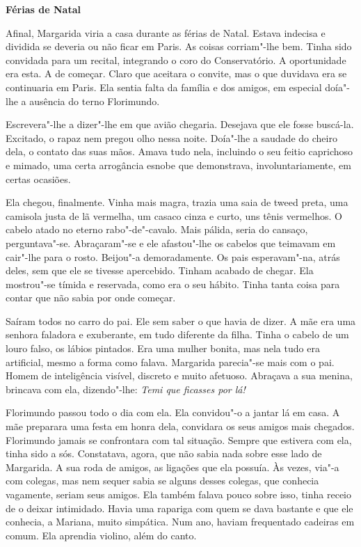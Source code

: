 \vspace*{1.8cm}
\noindent{}\textbf{Férias de Natal}

\bigskip

Afinal, Margarida viria a casa durante as férias de Natal. Estava
indecisa e dividida se deveria ou não ficar em Paris. As coisas
corriam"-lhe bem. Tinha sido convidada para um recital, integrando o coro
do Conservatório. A oportunidade era esta. A de começar. Claro que
aceitara o convite, mas o que duvidava era se continuaria em Paris. Ela
sentia falta da família e dos amigos, em especial doía"-lhe a ausência do
terno Florimundo.

Escrevera"-lhe a dizer"-lhe em que avião chegaria. Desejava que ele fosse
buscá-la. Excitado, o rapaz nem pregou olho nessa noite. Doía"-lhe a
saudade do cheiro dela, o contato das suas mãos. Amava tudo nela,
incluindo o seu feitio caprichoso e mimado, uma certa arrogância esnobe
que demonstrava, involuntariamente, em certas ocasiões.

Ela chegou, finalmente. Vinha mais magra, trazia uma saia de tweed
preta, uma camisola justa de lã vermelha, um casaco cinza e curto, uns
tênis vermelhos. O cabelo atado no eterno rabo"-de"-cavalo. Mais pálida,
seria do cansaço, perguntava"-se. Abraçaram"-se e ele afastou"-lhe os
cabelos que teimavam em cair"-lhe para o rosto. Beijou"-a demoradamente.
Os pais esperavam"-na, atrás deles, sem que ele se tivesse apercebido.
Tinham acabado de chegar. Ela mostrou"-se tímida e reservada, como era o
seu hábito. Tinha tanta coisa para contar que não sabia por onde
começar.

Saíram todos no carro do pai. Ele sem saber o que havia de dizer. A mãe
era uma senhora faladora e exuberante, em tudo diferente da filha. Tinha
o cabelo de um louro falso, os lábios pintados. Era uma mulher bonita,
mas nela tudo era artificial, mesmo a forma como falava. Margarida
parecia"-se mais com o pai. Homem de inteligência visível, discreto e
muito afetuoso. Abraçava a sua menina, brincava com ela, dizendo"-lhe:
\emph{Temi que ficasses por lá!}

Florimundo passou todo o dia com ela. Ela convidou"-o a jantar lá em
casa. A mãe preparara uma festa em honra dela, convidara os seus amigos
mais chegados. Florimundo jamais se confrontara com tal situação. Sempre
que estivera com ela, tinha sido a sós. Constatava, agora, que não sabia
nada sobre esse lado de Margarida. A sua roda de amigos, as ligações que
ela possuía. Às vezes, via"-a com colegas, mas nem sequer sabia se alguns
desses colegas, que conhecia vagamente, seriam seus amigos. Ela também
falava pouco sobre isso, tinha receio de o deixar intimidado. Havia uma
rapariga com quem se dava bastante e que ele conhecia, a Mariana, muito
simpática. Num ano, haviam frequentado cadeiras em comum. Ela aprendia
violino, além do canto.

